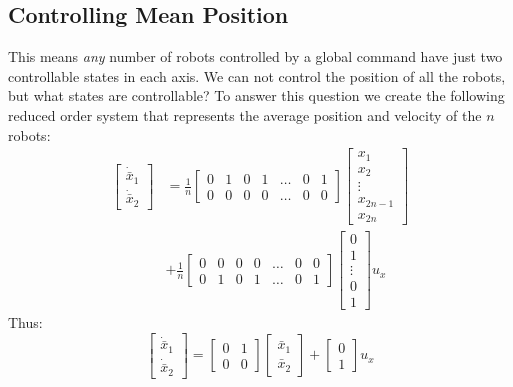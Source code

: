 \subsection{Controlling Mean Position}\label{sec:controlMeanPosition}
This means \emph{any} number of robots controlled by a global command have just two controllable states in each axis. We can not control the position of all the robots, but what states are controllable? To answer this question we create the following reduced order system that represents the average position and velocity of the $n$ robots:
\begin{align}
\begin{bmatrix}\nonumber
\dot{\bar{x}}_1 \\
\dot{\bar{x}}_2
\end{bmatrix} &= \frac{1}{n} \begin{bmatrix}
0& 1& 0& 1& \ldots &0& 1 \\
0& 0& 0& 0& \ldots &0& 0
\end{bmatrix}
\begin{bmatrix}
x_1\\
x_2\\
\vdots\\
x_{2n-1}\\
x_{2n}
\end{bmatrix} \\
&+ \frac{1}{n}\begin{bmatrix}
0& 0& 0& 0& \ldots &0& 0 \\
0& 1& 0& 1& \ldots &0& 1
\end{bmatrix}\begin{bmatrix} 
0\\
1\\
\vdots\\
0\\
1
\end{bmatrix} u_x
\end{align}
Thus:
\begin{equation}
\begin{bmatrix}
\dot{\bar{x}}_1 \\
\dot{\bar{x}}_2
\end{bmatrix} = \begin{bmatrix}
0& 1 \\
0& 0
\end{bmatrix}
\begin{bmatrix}
\bar{x}_1\\
\bar{x}_2
\end{bmatrix} + \begin{bmatrix} 
0\\
1
\end{bmatrix} u_x
\end{equation}

